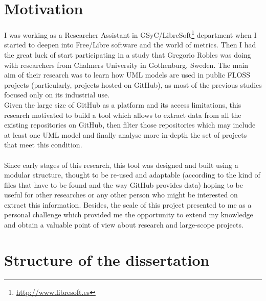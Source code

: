 \documentclass[a4paper, 12pt]{book}
\begin{document}
\section{Motivation}
\label{sec:motivation}
I was working as a Researcher Assistant in GSyC/LibreSoft\footnote{\url{http://www.libresoft.es}} department when I started to
deepen into Free/Libre software and the world of metrics. Then I had the great luck of start participating in a study that
Gregorio Robles was doing with researchers from Chalmers University in Gothenburg, Sweden. The main aim of their research was to
learn how UML models are used in public FLOSS projects (particularly, projects hosted on GitHub), as most of the previous studies
focused only on its industrial use.\\
Given the large size of GitHub as a platform and its access limitations, this research motivated to build a tool which allows to
extract data from all the existing repositories on GitHub, then filter those repositories which may include at least one
UML model and finally analyse more in-depth the set of projects that meet this condition.\\\\
Since early stages of this research, this tool was designed and built using a modular structure, thought to be re-used
and adaptable (according to the kind of files that have to be found and the way GitHub provides data) hoping to be useful
for other researches or any other person who might be interested on extract this information. Besides, the scale of this project
presented to me as a personal challenge which provided me the opportunity to extend my knowledge and obtain a valuable point of
view about research and large-scope projects.

\section{Structure of the dissertation}
\label{sec:estructura}



\cleardoublepage
\end{document}
